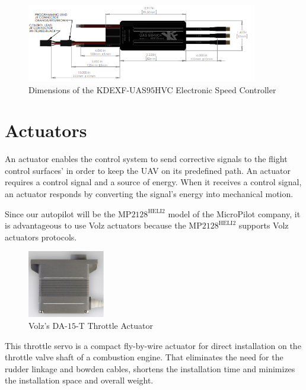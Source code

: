 \documentclass[english,fira]{ist-report}
\begin{document}
\begin{figure}[ht]
    \centering
    \includegraphics[width=0.9\textwidth]{graphics/AVIONICS/a.png}
    \caption{Dimensions of the  KDEXF-UAS$95$HVC Electronic Speed Controller}
    \label{fig:kdespeedcontrolerdim}
\end{figure}

\section{Actuators}
An actuator enables the control system to send corrective signals to the flight control surfaces’ in order to keep the UAV on its predefined path. An actuator requires a control signal and a source of energy. When it receives a control signal, an actuator responds by converting the signal's energy into mechanical motion. \par
Since our autopilot will be the MP$2128^{\text{HELI}2} $ model of the MicroPilot company, it is advantageous to use Volz actuators because the MP$2128^{\text{HELI}2} $ supports Volz actuators protocols. \par

\begin{figure}[ht]
    \centering
    \includegraphics[width=0.3\textwidth]{graphics/AVIONICS/actuators.png}
    \caption{Volz’s DA-$15$-T Throttle Actuator}
    \label{fig:volzthrotactuator}
\end{figure}

This throttle servo is a compact fly-by-wire actuator for direct installation on the throttle valve shaft of a combustion engine. That eliminates the need for the rudder linkage and bowden cables, shortens the installation time and minimizes the installation space and overall weight.
\end{document}
